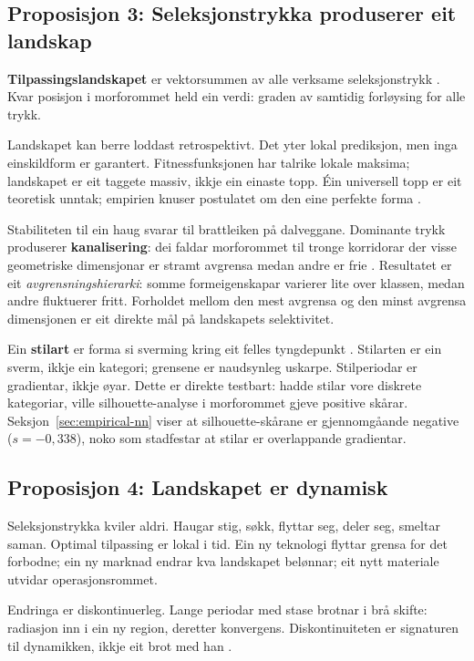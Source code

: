 \subsection{Proposisjon 3: Seleksjonstrykka produserer eit landskap}

\textbf{Tilpassingslandskapet} er vektorsummen av alle verksame seleksjonstrykk \parencite{Wright1932, Waddington1957}. Kvar posisjon i morforommet held ein verdi: graden av samtidig forløysing for alle trykk.

Landskapet kan berre loddast retrospektivt. Det yter lokal prediksjon, men inga einskildform er garantert. Fitnessfunksjonen har talrike lokale maksima; landskapet er eit taggete massiv, ikkje ein einaste topp. Éin universell topp er eit teoretisk unntak; empirien knuser postulatet om den eine perfekte forma \parencite{Kauffman1993}.

Stabiliteten til ein haug svarar til brattleiken på dalveggane. Dominante trykk produserer \textbf{kanalisering}: dei faldar morforommet til tronge korridorar der visse geometriske dimensjonar er stramt avgrensa medan andre er frie \parencite{Waddington1957}. Resultatet er eit \textit{avgrensningshierarki}: somme formeigenskapar varierer lite over klassen, medan andre fluktuerer fritt. Forholdet mellom den mest avgrensa og den minst avgrensa dimensjonen er eit direkte mål på landskapets selektivitet.

Ein \textbf{stilart} er forma si sverming kring eit felles tyngdepunkt \parencite{Kubler1962}. Stilarten er ein sverm, ikkje ein kategori; grensene er naudsynleg uskarpe. Stilperiodar er gradientar, ikkje øyar. Dette er direkte testbart: hadde stilar vore diskrete kategoriar, ville silhouette-analyse i morforommet gjeve positive skårar. Seksjon~\ref{sec:empirical-nn} viser at silhouette-skårane er gjennomgåande negative ($s = -0{,}338$), noko som stadfestar at stilar er overlappande gradientar.

\subsection{Proposisjon 4: Landskapet er dynamisk}

Seleksjonstrykka kviler aldri. Haugar stig, søkk, flyttar seg, deler seg, smeltar saman. Optimal tilpassing er lokal i tid. Ein ny teknologi flyttar grensa for det forbodne; ein ny marknad endrar kva landskapet belønnar; eit nytt materiale utvidar operasjonsrommet.

Endringa er diskontinuerleg. Lange periodar med stase brotnar i brå skifte: radiasjon inn i ein ny region, deretter konvergens. Diskontinuiteten er signaturen til dynamikken, ikkje eit brot med han \parencite{ElredgeGould1972}.

